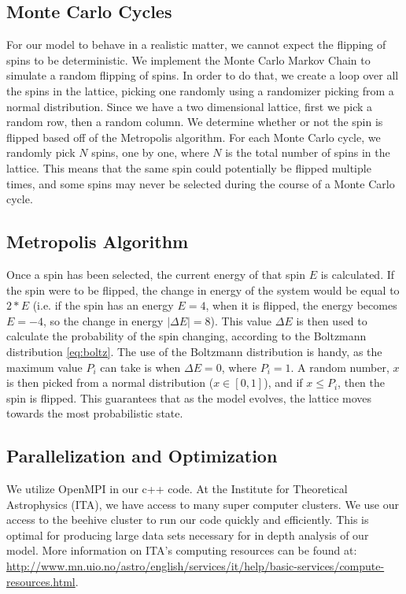 \documentclass[a4paper]{article}
\begin{document}
\subsection{Monte Carlo Cycles}
For our model to behave in a realistic matter, we cannot expect the flipping of spins to be deterministic. We implement the Monte Carlo Markov Chain to simulate a random flipping of spins.  In order to do that, we create a loop over all the spins in the lattice, picking one randomly using a randomizer picking from a normal distribution. Since we have a two dimensional lattice, first we pick a random row, then a random column. We determine whether or not the spin is flipped based off of the Metropolis algorithm. For each Monte Carlo cycle, we randomly pick $N$ spins, one by one, where $N$ is the total number of spins in the lattice. This means that the same spin could potentially be flipped multiple times, and some spins may never be selected during the course of a Monte Carlo cycle.
\subsection{Metropolis Algorithm}
Once a spin has been selected, the current energy of that spin $E$ is calculated. If the spin were to be flipped, the change in energy of the system would be equal to $2*E$ (i.e. if the spin has an energy $E=4$, when it is flipped, the energy becomes $E=-4$, so the change in energy $|\Delta	E| = 8$). This value $\Delta E$ is then used to calculate the probability of the spin changing, according to the Boltzmann distribution \ref{eq:boltz}. The use of the Boltzmann distribution is handy, as the maximum value $P_i$ can take is when $\Delta E=0$, where $P_i = 1$. A random number, $x$ is then picked from a normal distribution ($x \in [0,1]$), and if $x \leq P_i$, then the spin is flipped. This guarantees that as the model evolves, the lattice moves towards the most probabilistic state.
\subsection{Parallelization and Optimization}
We utilize OpenMPI in our c++ code. At the Institute for Theoretical Astrophysics (ITA), we have access to many super computer clusters. We use our access to the beehive cluster to run our code quickly and efficiently. This is optimal for producing large data sets necessary for in depth analysis of our model. More information on ITA's computing resources can be found at: \url{http://www.mn.uio.no/astro/english/services/it/help/basic-services/compute-resources.html}.
\clearpage
\end{document}
